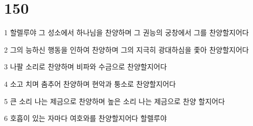 \chapter{150}

\par 1 할렐루야 그 성소에서 하나님을 찬양하며 그 권능의 궁창에서 그를 찬양할지어다
\par 2 그의 능하신 행동을 인하여 찬양하며 그의 지극히 광대하심을 좇아 찬양할지어다
\par 3 나팔 소리로 찬양하며 비파와 수금으로 찬양할지어다
\par 4 소고 치며 춤추어 찬양하며 현악과 퉁소로 찬양할지어다
\par 5 큰 소리 나는 제금으로 찬양하며 높은 소리 나는 제금으로 찬양 할지어다
\par 6 호흡이 있는 자마다 여호와를 찬양할지어다 할렐루야


